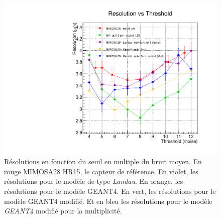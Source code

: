    \begin{figure}[!htb]
    \begin{center} 
     \includegraphics[scale=0.52]{./figures/Plots_resultat_simu/G4_landau_res_oct.pdf}
     \caption{R\'esolutions en fonction du seuil en multiple du bruit moyen. En rouge MIMOSA28 HR15, le capteur de r\'ef\'erence. En violet, les r\'esolutions pour le mod\`ele de type \textit{Landau}. En orange, les r\'esolutions pour le mod\`ele GEANT4. En vert, les r\'esolutions pour le mod\`ele GEANT4 modifi\'e. Et en bleu les r\'esolutions pour le mod\`ele \textit{GEANT4} modifi\'e pour la multiplicit\'e.}
    \label{fig:resolution}
    \end{center}
   \end{figure} 
   
   \medskip
   
